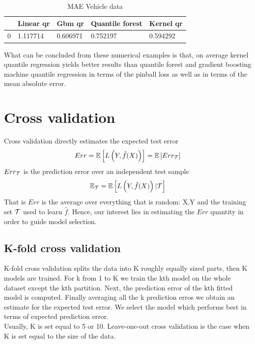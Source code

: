 \begin{table}
    \caption{MAE Vehicle data}
    \begin{tabular}{lllll}
    \toprule
     & Linear qr & Gbm qr & Quantile forest & Kernel qr \\
    \midrule
    0 & 1.117714 & 0.606971 & 0.752197 & 0.594292 \\
    \bottomrule
    \end{tabular}
\end{table}
What can be concluded from these numerical examples is that, on average kernel quantile regression yields better results than quantile forest \cite{meinshausen2006quantile} and gradient boosting machine quantile regression \cite {friedman2001greedy} in terms of the pinball loss as well as in terms of the mean absolute error.



\section{Cross validation}
Cross validation directly estimates the expected test error
\begin{equation}
    Err=\mathbb{E}\left[L\left(Y,\hat{f}(X)\right)\right]=\mathbb{E}\left[Err_{\mathcal{T}}\right]
\end{equation}
$Err_{\mathcal{T}}$ is the prediction error over an independent test sample
\begin{equation}
    \mathbb{E}_{\mathcal{T}}=\mathbb{E}\left[L\left(Y,\hat{f}(X)\right)| \mathcal{T} \right]
\end{equation}
That is $Err$ is the average over everything that is random: X,Y and the training set $\mathcal{T}$ used to learn $\hat{f}$. Hence, our interest lies in estimating the $Err$ quantity in order to guide model selection.
\subsection{K-fold cross validation}
K-fold cross validation splits the data into K roughly equally sized parts, then K models are trained. For k from 1 to K we train the kth model on the whole dataset except the kth partition. Next,  the prediction error of the kth fitted model is computed. Finally averaging all the k prediction erros we obtain an estimate for the expected test error. We select the model which performs best in terms of expected prediction error.
\\
Usually, K is set equal to 5 or 10. Leave-one-out cross validation is the case when K is set equal to the size of the data.
